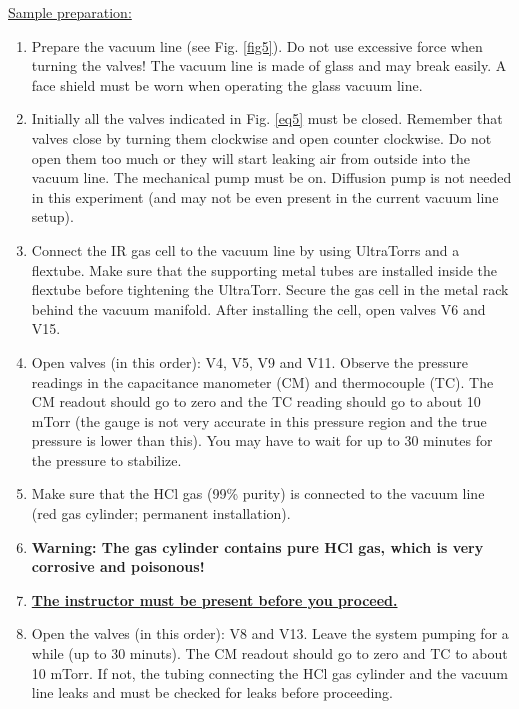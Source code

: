 \documentclass[byrevtex,amssymb,aps,pra,floatfix,letterpaper]{revtex4}
\begin{document}
\noindent
\underline{Sample preparation:}\\

\noindent
\begin{enumerate}
\item Prepare the vacuum line (see Fig. \ref{fig5}). Do not use excessive force when turning the valves! The vacuum line is made of glass and may break easily. A face shield must be worn when operating the glass vacuum line.

\item Initially all the valves indicated in Fig. \ref{eq5} must be closed. Remember that valves close by turning them clockwise and open counter clockwise. Do not open them too much or they will start leaking air from outside into the vacuum line. The mechanical pump must be on. Diffusion pump is not needed in this experiment (and may not be even present in the current vacuum line setup).

\item Connect the IR gas cell to the vacuum line by using UltraTorrs and a flextube. Make sure that the supporting metal tubes are installed inside the flextube before tightening the UltraTorr. Secure the gas cell in the metal rack behind the vacuum manifold. After installing the cell, open valves V6 and V15.

\item Open valves (in this order): V4, V5, V9 and V11. Observe the pressure readings in the capacitance manometer (CM) and thermocouple (TC). The CM readout should go to zero and the TC reading should go to about 10 mTorr (the gauge is not very accurate in this pressure region and the true pressure is lower than this). You may have to wait for up to 30 minutes for the pressure to stabilize.

\item Make sure that the HCl gas (99\% purity) is connected to the vacuum line (red gas cylinder; permanent installation).

\item[] \textbf{Warning: The gas cylinder contains pure HCl gas, which is very corrosive and poisonous!}

\item[] \vspace{0.5cm}\underline{\textbf{\Large The instructor must be present before you proceed.}}\vspace{0.5cm}

\item Open the valves (in this order): V8 and V13. Leave the system pumping for a while (up to 30 minuts). The CM readout should go to zero and TC to about 10 mTorr. If not, the tubing connecting the HCl gas cylinder and the vacuum line leaks and must be checked for leaks before proceeding.


\end{enumerate}
\end{document}
